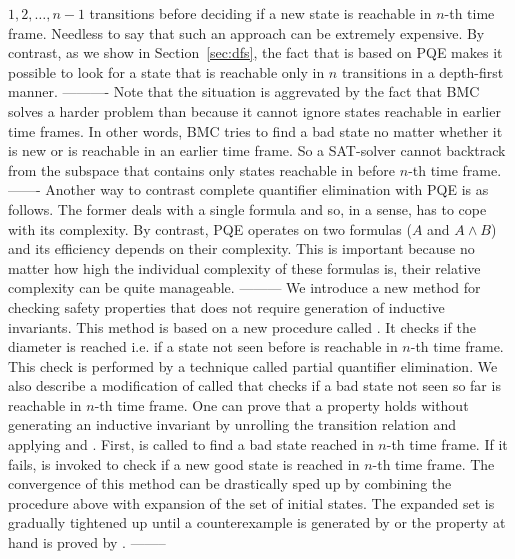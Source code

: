 $1,2,\dots,n-1$ transitions before deciding if a new state is
reachable in $n$-th time frame. Needless to say that such an approach
can be extremely expensive. By contrast, as we show in
Section~\ref{sec:dfs}, the fact that \NS is based on PQE makes it
possible to look for a state that is reachable only in $n$ transitions
in a depth-first manner.
----------
Note that the situation is aggrevated by the fact that BMC
solves a harder problem than \NBS because it cannot ignore states
reachable in earlier time frames. In other words, BMC tries to find a
bad state no matter whether it is new or is reachable in an earlier
time frame.  So a SAT-solver cannot backtrack from the subspace that
contains only states reachable in before $n$-th time frame. 
-------
 Another way to contrast complete
quantifier elimination with PQE is as follows.  The former deals with
a single formula and so, in a sense, has to cope with its
 complexity. By contrast, PQE operates on two formulas
($A$ and $A \wedge B$) and its efficiency depends on their
 complexity.  This is important because no matter how
high the individual complexity of these formulas is, their relative
complexity can be quite manageable.
---------
We introduce a new method for checking safety properties that does not
require generation of inductive invariants.  This method is based on a
new procedure called \cd. It checks if the diameter is reached i.e. if
a state not seen before is reachable in $n$-th time frame.  This check
is performed by a technique called partial quantifier elimination. We
also describe a modification of \CD called \BS that checks if a bad
state not seen so far is reachable in $n$-th time frame.  One can
prove that a property holds without generating an inductive invariant
by unrolling the transition relation and applying \BS and \cd. First,
\BS is called to find a bad state reached in $n$-th time frame. If it
fails, \CD is invoked to check if a new good state is reached in
$n$-th time frame. The convergence of this method can be drastically
sped up by combining the procedure above with expansion of the set of
initial states.  The expanded set is gradually tightened up until a
counterexample is generated by \BS or the property at hand is proved
by \cd.
--------
